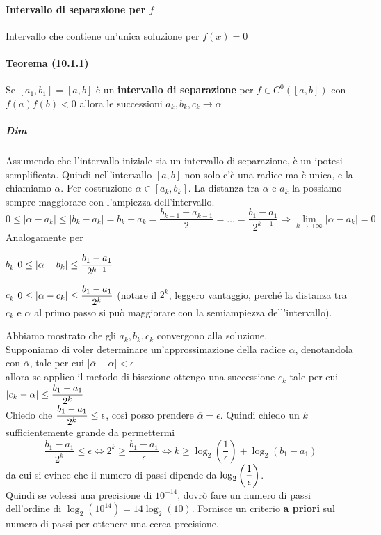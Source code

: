 \documentclass[10pt]{book}
\begin{document}
\paragraph{Intervallo di separazione per $f$} Intervallo che contiene un'unica soluzione per $f(x) = 0$
\paragraph{Teorema (10.1.1)} Se $[a_1, b_1] = [a, b]$ è un \textbf{intervallo di separazione} per $f \in C^0([a, b])$ con $f(a)f(b) < 0$ allora le successioni $a_k, b_k, c_k \longrightarrow \alpha$
\subparagraph{Dim} Assumendo che l'intervallo iniziale sia un intervallo di separazione, è un ipotesi semplificata. Quindi nell'intervallo $[a, b]$ non solo c'è una radice ma è unica, e la chiamiamo $\alpha$. Per costruzione $\alpha \in [a_k, b_k]$. La distanza tra $\alpha$ e $a_k$ la possiamo sempre maggiorare con l'ampiezza dell'intervallo.
$$0 \leq |\alpha - a_k| \leq |b_k - a_k| = b_k - a_k = \frac{b_{k-1} - a_{k-1}}{2} = \ldots = \frac{b_1 - a_1}{2^{k-1}} \Rightarrow \lim_{k\to +\infty} |\alpha - a_k| = 0$$
Analogamente per \begin{list}{}{}
	\item $b_k$ $0\leq |\alpha - b_k| \leq \mathlarger{\frac{b_1 - a_1}{2^{k-1}}}$
	\item $c_k$ $0\leq |\alpha - c_k| \leq \mathlarger{\frac{b_1 - a_1}{2^{k}}}$ (notare il $2^k$, leggero vantaggio, perché la distanza tra $c_k$ e $\alpha$ al primo passo si può maggiorare con la semiampiezza dell'intervallo).
\end{list}
Abbiamo mostrato che gli $a_k, b_k, c_k$ convergono alla soluzione.\\
Supponiamo di voler determinare un'approssimazione della radice $\alpha$, denotandola con $\overline{\alpha}$, tale per cui $|\overline{\alpha} - \alpha| < \epsilon$\\ allora se applico il metodo di bisezione ottengo una successione $c_k$ tale per cui $|c_k - \alpha| \leq \mathlarger{\frac{b_1 - a_1}{2^k}}$\\
Chiedo che $\mathlarger{\frac{b_1 - a_1}{2^k}} \leq \epsilon$, così posso prendere $\overline{\alpha} = \epsilon$. Quindi chiedo un $k$ sufficientemente grande da permettermi $$\frac{b_1 - a_1}{2^k} \leq \epsilon \Leftrightarrow 2^k \geq \frac{b_1 - a_1}{\epsilon} \Leftrightarrow k \geq \log_2\left(\frac{1}{\epsilon}\right) + \log_2\left(b_1 - a_1\right)$$
da cui si evince che il numero di passi dipende da $\log_2\left(\mathlarger{\frac{1}{\epsilon}}\right)$.\\
Quindi se volessi una precisione di $10^{-14}$, dovrò fare un numero di passi dell'ordine di $\log_2(10^{14}) = 14\log_2(10)$. Fornisce un criterio \textbf{a priori} sul numero di passi per ottenere una cerca precisione.
\end{document}
